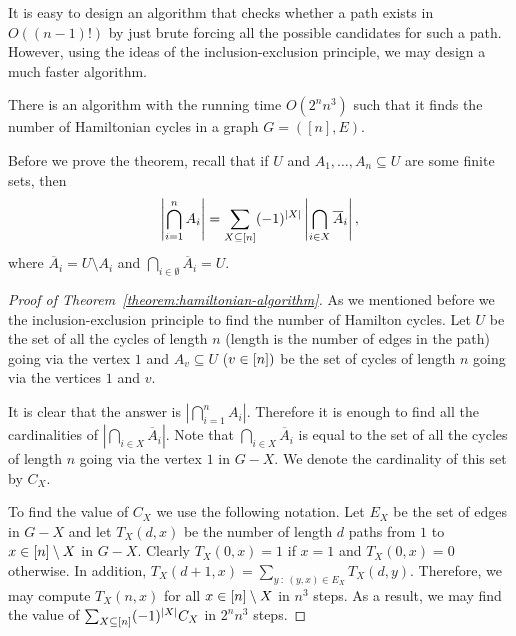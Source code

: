 It is easy to design an algorithm that checks whether a path exists in
$O((n - 1)!)$ by just brute forcing all the possible candidates for such a path.
However, using the ideas of the inclusion-exclusion principle, we may design
a much faster algorithm.
\begin{theorem}
\label{theorem:hamiltonian-algorithm}
  There is an algorithm with the running time $O(2^n n^3)$ such that it finds
  the number of Hamiltonian cycles in a graph $G = ([n], E)$.
\end{theorem}

Before we prove the theorem, recall that if $U$ and
$A_1, \dots, A_n \subseteq U$ are some finite sets, then
\[
  \left| \bigcap_{i = 1}^n A_i \right| =
  \sum_{X \subseteq [{n}]} (-1)^{|X|}
    \left| \bigcap_{i \in X} \overline{A}_i \right|,
\]
where $\overline{A}_i = U \setminus A_i$ and
$\bigcap_{i \in \emptyset} \overline{A}_i = U$.

\begin{proof}[Proof of Theorem~\ref{theorem:hamiltonian-algorithm}]
  As we mentioned before we the inclusion-exclusion principle to find the number
  of Hamilton cycles. Let $U$ be the set of all the cycles of length $n$
  (length is the number of edges in the path) going
  via the vertex $1$ and $A_v \subseteq U$ ($v \in [{n}])$ be the set of cycles of
  length $n$ going via the vertices $1$ and $v$.

  It is clear that the answer is $\left| \bigcap_{i = 1}^n A_i \right|$.
  Therefore it is enough to find all the cardinalities of
  $\left| \bigcap_{i \in X} \overline{A}_i \right|$. Note that
  $\bigcap_{i \in X} \overline{A}_i$ is equal to the set of all the cycles of
  length $n$ going via the vertex $1$ in $G - X$. We denote the cardinality of
  this set by $C_X$.

  To find the value of $C_X$ we use the following notation.
  Let $E_X$ be the set of edges in $G - X$ and let $T_X(d, x)$ be
  the number of length $d$ paths from $1$ to $x \in [{n}] \setminus X$ in $G - X$.
  Clearly $T_X(0, x) = 1$ if $x = 1$ and $T_X(0, x) = 0$ otherwise. In addition,
  $T_X(d + 1, x) = \sum_{y ~:~ (y, x) \in E_X} T_X(d, y)$. Therefore, we may
  compute $T_X(n, x)$ for all $x \in [{n}] \setminus X$ in $n^3$ steps. As a
  result, we may find the value of $\sum_{X \subseteq [{n}]} (-1)^{|X|} C_X$ in
  $2^n n^3$ steps.
\end{proof}

